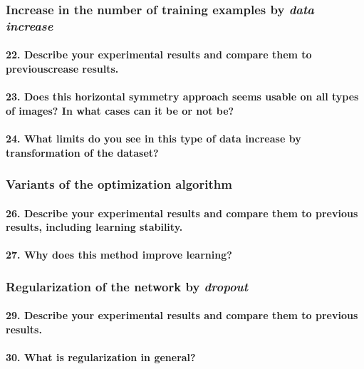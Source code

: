 \documentclass{article}
\theoremstyle{plain}%
\theoremstyle{definition}
\theoremstyle{remark}
\begin{document}
\subsubsection{Increase in the number of training examples by \textit{data increase}}
\paragraph{22. Describe your experimental results and compare them to previouscrease results.}

\paragraph{23. Does this horizontal symmetry approach seems usable on all types of images? In what cases can it be or not be?}

\paragraph{24. What limits do you see in this type of data increase by transformation of the dataset?}

\subsubsection{Variants of the optimization algorithm}
\paragraph{26. Describe your experimental results and compare them to previous results, including learning stability.}

\paragraph{27. Why does this method improve learning?}


\subsubsection{Regularization of the network by \textit{dropout}}
\paragraph{29. Describe your experimental results and compare them to previous results.}

\paragraph{30. What is regularization in general?}
\end{document}
